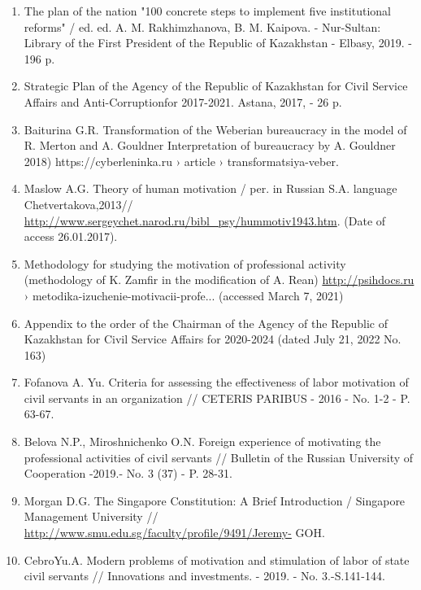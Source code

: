\begin{enumerate}
\item
The plan of the nation "100 concrete steps to implement five
institutional reforms" / ed. ed. A. M. Rakhimzhanova, B. M. Kaipova. -
Nur-Sultan: Library of the First President of the Republic of Kazakhstan
- Elbasy, 2019. - 196 p.

\item
Strategic Plan of the Agency of the Republic of Kazakhstan for Civil
Service Affairs and Anti-Corruptionfor 2017-2021. Astana, 2017, - 26 p.

\item
Baiturina G.R. Transformation of the Weberian bureaucracy in the
model of R. Merton and A. Gouldner Interpretation of bureaucracy by A.
Gouldner 2018) https://cyberleninka.ru › article ›
transformatsiya-veber.

\item
Maslow A.G. Theory of human motivation / per. in Russian S.A.
language Chetvertakova,2013//
\url{http://www.sergeychet.narod.ru/bibl\_psy/hummotiv1943.htm}. (Date of
access 26.01.2017).

\item
Methodology for studying the motivation of professional activity
(methodology of K. Zamfir in the modification of A.
Rean) \url{http://psihdocs.ru} › metodika-izuchenie-motivacii-profe...
(accessed March 7, 2021)

\item
Appendix to the order of the Chairman of the Agency of the Republic
of Kazakhstan for Civil Service Affairs for 2020-2024 (dated July 21,
2022 No. 163)

\item
Fofanova A. Yu. Criteria for assessing the effectiveness of labor
motivation of civil servants in an organization // CETERIS PARIBUS -
2016 - No. 1-2 - P. 63-67.

\item
Belova N.P., Miroshnichenko O.N. Foreign experience of motivating
the professional activities of civil servants // Bulletin of the Russian
University of Cooperation -2019.- No. 3 (37) - P. 28-31.

\item
Morgan D.G. The Singapore Constitution: A Brief Introduction /
Singapore Management University //
\url{http://www.smu.edu.sg/faculty/profile/9491/Jeremy-}
GOH.

\item
CebroYu.A. Modern problems of motivation and stimulation of labor of
state civil servants // Innovations and investments. - 2019. - No.
3.-S.141-144.
\end{enumerate}

